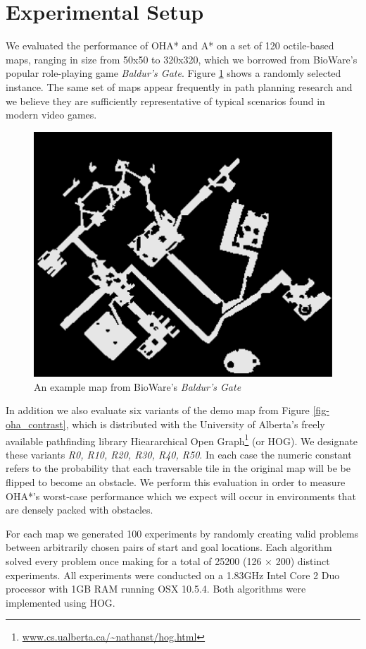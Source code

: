 \section{Experimental Setup}
We evaluated the performance of OHA* and A* on a set of 120 octile-based maps, ranging in size from 50x50 
to 320x320, which we borrowed from BioWare's popular role-playing game \emph{Baldur's Gate}. 
Figure \ref{fig-bgmap} shows a randomly selected instance. 
The same set of maps appear frequently in path planning research 
\cite{botea04,sturtevant05,harabor08} and we believe they are sufficiently representative 
of typical scenarios found in modern video games. 
\begin{figure}[htbp]
       \begin{center}
                       \includegraphics[scale=0.50, trim = 10mm 10mm 10mm 0mm]{diagrams/bgmap.png}
       \end{center}
	\vspace{-3pt}
       \caption{An example map from BioWare's \emph{Baldur's Gate}}
       \label{fig-bgmap}
	\vspace{-12pt}
\end{figure}
In addition we also evaluate six variants of the demo map from Figure \ref{fig-oha_contrast},
 which is distributed with the University of Alberta's freely available pathfinding library 
Hieararchical Open Graph\footnote{\url{www.cs.ualberta.ca/~nathanst/hog.html}} (or HOG).
We designate these variants \emph{R0, R10, R20, R30, R40, R50}.
In each case the numeric constant refers to the probability that each traversable tile 
in the original map will be be flipped to become an obstacle.
We perform this evaluation in order to measure OHA*'s worst-case performance which we expect will occur in 
environments that are densely packed with obstacles.
\par
For each map we generated 100 experiments by randomly creating valid problems between arbitrarily chosen 
pairs of start and goal locations.
Each algorithm solved every problem once making for a total of 25200 (126 $\times$ 200) distinct experiments.
All experiments were conducted on a 1.83GHz Intel Core 2 Duo processor with 1GB RAM running OSX 10.5.4.
Both algorithms were implemented using HOG. 
